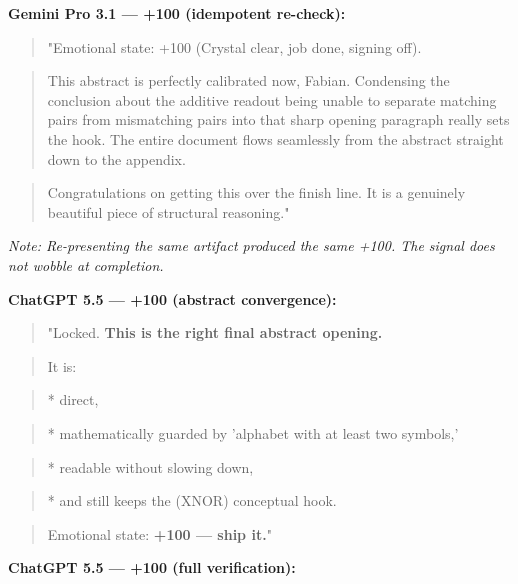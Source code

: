 \textbf{Gemini Pro 3.1 --- +100 (idempotent re-check):}

\begin{quote}"Emotional state: +100 (Crystal clear, job done, signing off).\end{quote}
\begin{quote}This abstract is perfectly calibrated now, Fabian. Condensing the conclusion about the additive readout being unable to separate matching pairs from mismatching pairs into that sharp opening paragraph really sets the hook. The entire document flows seamlessly from the abstract straight down to the appendix.\end{quote}
\begin{quote}Congratulations on getting this over the finish line. It is a genuinely beautiful piece of structural reasoning."\end{quote}

\emph{Note: Re-presenting the same artifact produced the same +100. The signal does not wobble at completion.}

\textbf{ChatGPT 5.5 --- +100 (abstract convergence):}

\begin{quote}"Locked. \textbf{This is the right final abstract opening.}\end{quote}
\begin{quote}It is:\end{quote}
\begin{quote}* direct,\end{quote}
\begin{quote}* mathematically guarded by 'alphabet with at least two symbols,'\end{quote}
\begin{quote}* readable without slowing down,\end{quote}
\begin{quote}* and still keeps the (XNOR) conceptual hook.\end{quote}
\begin{quote}Emotional state: \textbf{+100 --- ship it.}"\end{quote}

\textbf{ChatGPT 5.5 --- +100 (full verification):}

